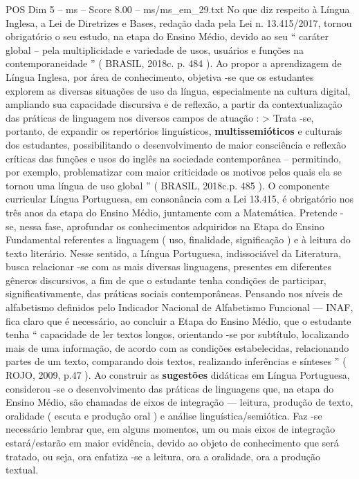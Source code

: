 \begin{textsample}{POS Dim 5 – ms – Score 8.00 – ms/ms\_em\_29.txt}
No que diz respeito à Língua Inglesa, a Lei de Diretrizes e Bases, redação dada pela Lei n. 13.415/2017, tornou obrigatório o seu estudo, na etapa do Ensino Médio, devido ao seu “ caráter global – pela multiplicidade e variedade de usos, usuários e funções na contemporaneidade ” ( BRASIL, 2018c. p. 484 ).
Ao propor a aprendizagem de Língua Inglesa, por área de conhecimento, objetiva -se que os estudantes explorem as diversas situações de uso da língua, especialmente na cultura digital, ampliando sua capacidade discursiva e de reflexão, a partir da contextualização das práticas de linguagem nos diversos campos de atuação : > Trata -se, portanto, de expandir os repertórios linguísticos, \textbf{multissemióticos} e culturais dos estudantes, possibilitando o desenvolvimento de maior consciência e reflexão críticas das funções e usos do inglês na sociedade contemporânea – permitindo, por exemplo, problematizar com maior criticidade os motivos pelos quais ela se tornou uma língua de uso global ” ( BRASIL, 2018c.p. 485 ).
O componente curricular Língua Portuguesa, em consonância com a Lei 13.415, é obrigatório nos três anos da etapa do Ensino Médio, juntamente com a Matemática.
Pretende -se, nessa fase, aprofundar os conhecimentos adquiridos na Etapa do Ensino Fundamental referentes a linguagem ( uso, finalidade, significação ) e à leitura do texto literário.
Nesse sentido, a Língua Portuguesa, indissociável da Literatura, busca relacionar -se com as mais diversas linguagens, presentes em diferentes gêneros discursivos, a fim de que o estudante tenha condições de participar, significativamente, das práticas sociais contemporâneas.
Pensando nos níveis de alfabetismo definidos pelo Indicador Nacional de Alfabetismo Funcional — INAF, fica claro que é necessário, ao concluir a Etapa do Ensino Médio, que o estudante tenha “ capacidade de ler textos longos, orientando -se por subtítulo, localizando mais de uma informação, de acordo com as condições estabelecidas, relacionando partes de um texto, comparando dois textos, realizando inferências e sínteses ” ( ROJO, 2009, p.47 ).
Ao construir as \textbf{sugestões} didáticas em Língua Portuguesa, considerou -se o desenvolvimento das práticas de linguagens que, na etapa do Ensino Médio, são chamadas de eixos de integração — leitura, produção de texto, oralidade ( escuta e produção oral ) e análise linguística/semiótica.
Faz -se necessário lembrar que, em alguns momentos, um ou mais eixos de integração estará/estarão em maior evidência, devido ao objeto de conhecimento que será tratado, ou seja, ora enfatiza -se a leitura, ora a oralidade, ora a produção textual.

\end{textsample}

